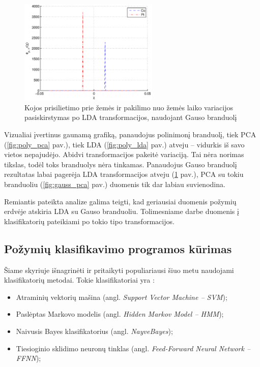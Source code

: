 \documentclass[]{vgtuef}
\begin{document}
\begin{figure}[!t]
  \centering
  \includegraphics[width=250px]{figures/st_sw_gauss_gda.eps}
  \caption{Kojos prisilietimo prie žemės ir pakilimo nuo žemės laiko variacijos pasiskirstymas po LDA transformacijos, naudojant Gauso branduolį}
  \label{fig:gauss_lda}
\end{figure}

Vizualiai įvertinus gaunamą grafiką, panaudojus polinimonį branduolį, tiek PCA (\ref{fig:poly_pca} pav.), tiek LDA (\ref{fig:poly_lda} pav.) atveju -- vidurkis iš savo vietos nepajudėjo. Abidvi transformacijos pakeitė variaciją. Tai nėra norimas tikslas, todėl toks branduolys nėra tinkamas. Panaudojus Gauso branduolį rezultatas labai pagerėja LDA transformacijos atveju (\ref{fig:gauss_lda} pav.), PCA su tokiu branduoliu (\ref{fig:gauss_pca} pav.) duomenis tik dar labiau suvienodina.

Remiantis pateikta analize galima teigti, kad geriausiai duomenis požymių erdvėje atskiria LDA su Gauso branduoliu. Tolimesniame darbe duomenis į klasifikatorių pateikiami po tokio tipo transformacijos.

\subsection{Požymių klasifikavimo programos kūrimas}

Šiame skyriuje išnagrinėti ir pritaikyti populiariausi šiuo metu naudojami klasifikatorių metodai. Tokie klasifikatoriai yra \cite{824819}:

\begin{itemize}
\item Atraminių vektorių mašina (angl. \textit{Support Vector Machine -- SVM});
\item Paslėptas Markovo modelis (angl. \textit{Hidden Markov Model -- HMM});
\item Naivusis Bayes klasifikatorius (angl. \textit{NayveBayes});
\item Tiesioginio sklidimo neuronų tinklas (angl. \textit{Feed-Forward Neural Network -- FFNN});
\end{itemize}
\end{document}
